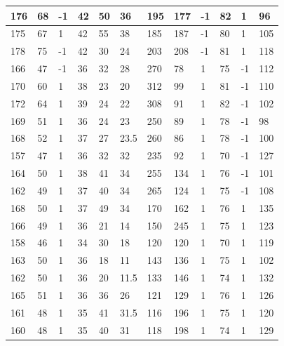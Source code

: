 \documentclass{article} %
\begin{document}
\begin{table}[H]
\begin{tabular}{|l|l|l|l|l|l|l|l|l|l|l|l|}
176 & 68 & -1 & 42 & 50 & 36   & 195 & 177 & -1 & 82  & 1   & 96  \\ \hline
175 & 67 & 1  & 42 & 55 & 38   & 185 & 187 & -1 & 80  & 1   & 105 \\ \hline
178 & 75 & -1 & 42 & 30 & 24   & 203 & 208 & -1 & 81  & 1   & 118 \\ \hline
166 & 47 & -1 & 36 & 32 & 28   & 270 & 78  & 1  & 75  & -1  & 112 \\ \hline
170 & 60 & 1  & 38 & 23 & 20   & 312 & 99  & 1  & 81  & -1  & 110 \\ \hline
172 & 64 & 1  & 39 & 24 & 22   & 308 & 91  & 1  & 82  & -1  & 102 \\ \hline
169 & 51 & 1  & 36 & 24 & 23   & 250 & 89  & 1  & 78  & -1  & 98  \\ \hline
168 & 52 & 1  & 37 & 27 & 23.5 & 260 & 86  & 1  & 78  & -1  & 100 \\ \hline
157 & 47 & 1  & 36 & 32 & 32   & 235 & 92  & 1  & 70  & -1  & 127 \\ \hline
164 & 50 & 1  & 38 & 41 & 34   & 255 & 134 & 1  & 76  & -1  & 101 \\ \hline
162 & 49 & 1  & 37 & 40 & 34   & 265 & 124 & 1  & 75  & -1  & 108 \\ \hline
168 & 50 & 1  & 37 & 49 & 34   & 170 & 162 & 1  & 76  & 1   & 135 \\ \hline
166 & 49 & 1  & 36 & 21 & 14   & 150 & 245 & 1  & 75  & 1   & 123 \\ \hline
158 & 46 & 1  & 34 & 30 & 18   & 120 & 120 & 1  & 70  & 1   & 119 \\ \hline
163 & 50 & 1  & 36 & 18 & 11   & 143 & 136 & 1  & 75  & 1   & 102 \\ \hline
162 & 50 & 1  & 36 & 20 & 11.5 & 133 & 146 & 1  & 74  & 1   & 132 \\ \hline
165 & 51 & 1  & 36 & 36 & 26   & 121 & 129 & 1  & 76  & 1   & 126 \\ \hline
161 & 48 & 1  & 35 & 41 & 31.5 & 116 & 196 & 1  & 75  & 1   & 120 \\ \hline
160 & 48 & 1  & 35 & 40 & 31   & 118 & 198 & 1  & 74  & 1   & 129 \\ \hline
\end{tabular}
\end{table}

\clearpage
\end{document}
